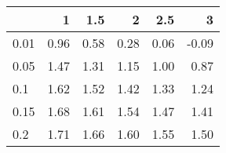 
\begin{tabular}{lrrrrr}
\toprule
  & 1 & 1.5 & 2 & 2.5 & 3\\
\midrule
0.01 & 0.96 & 0.58 & 0.28 & 0.06 & -0.09\\
0.05 & 1.47 & 1.31 & 1.15 & 1.00 & 0.87\\
0.1 & 1.62 & 1.52 & 1.42 & 1.33 & 1.24\\
0.15 & 1.68 & 1.61 & 1.54 & 1.47 & 1.41\\
0.2 & 1.71 & 1.66 & 1.60 & 1.55 & 1.50\\
\bottomrule
\end{tabular}
